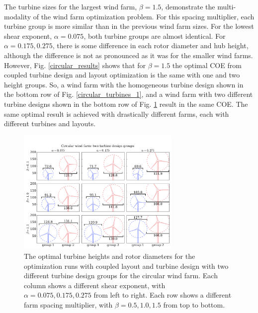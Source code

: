 The turbine sizes for the largest wind farm, $\beta=1.5$, demonstrate the multi-modality of the wind farm optimization problem. For this spacing multiplier, each turbine group is more similar than in the previous wind farm sizes. For the lowest shear exponent, $\alpha=0.075$, both turbine groups are almost identical. For $\alpha=0.175,0.275$, there is some difference in each rotor diameter and hub height, although the difference is not as pronounced as it was for the smaller wind farms. However, Fig. \ref{circular_results} shows that for $\beta=1.5$ the optimal COE from coupled turbine design and layout optimization is the same with one and two height groups. So, a wind farm with the homogeneous turbine design shown in the bottom row of Fig. \ref{circular_turbines_1}, and a wind farm with two different turbine designs shown in the bottom row of Fig. \ref{circular_turbines} result in the same COE. The same optimal result is achieved with drastically different farms, each with different turbines and layouts.  

\begin{figure}[htbp]
  \centering
  \includegraphics[trim={0.5cm 0.3cm 0.3cm 1.75cm},clip,width=0.7\textwidth]{Figures/turbineSizesCircular_2.pdf}
  \caption{\label{circular_turbines} The optimal turbine heights and rotor diameters for the optimization runs with coupled layout and turbine design with two different turbine design groups for the circular wind farm. Each column shows a different shear exponent, with $\alpha=0.075,0.175,0.275$ from left to right. Each row shows a different farm spacing multiplier, with $\beta=0.5,1.0,1.5$ from top to bottom.}
\end{figure}


